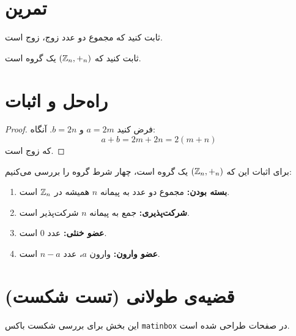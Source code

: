 \documentclass{matinbook}
\begin{document}
\section{تمرین}
\label{sec:exercise}

\begin{exercise}
    ثابت کنید که مجموع دو عدد زوج، زوج است.
    \label{exe:sum-even}
\end{exercise}

\begin{exercise}
    ثابت کنید که $(\mathbb{Z}_n, +_n)$ یک گروه است.
    \label{exe:zn-group}
\end{exercise}

\section{راه‌حل و اثبات}
\label{sec:solution-proof}

\begin{proof}
    فرض کنید $a = 2m$ و $b = 2n$. آنگاه:
    \[
    a + b = 2m + 2n = 2(m + n)
    \]
    که زوج است.
\end{proof}

\begin{solution}
    برای اثبات این که $(\mathbb{Z}_n, +_n)$ یک گروه است، چهار شرط
    گروه را بررسی می‌کنیم:
    \begin{enumerate}
        \item \textbf{بسته بودن:} مجموع دو عدد به پیمانه $n$
        همیشه در $\mathbb{Z}_n$ است.
        \item \textbf{شرکت‌پذیری:} جمع به پیمانه $n$ شرکت‌پذیر است.
        \item \textbf{عضو خنثی:} عدد $0$ است.
        \item \textbf{عضو وارون:} وارون $a$، عدد $n - a$ است.
    \end{enumerate}
\end{solution}

\section{قضیه‌ی طولانی (تست شکست)}
\label{sec:long-theorem}

این بخش برای بررسی شکست باکس \texttt{matinbox} در صفحات
طراحی شده است.
\end{document}
